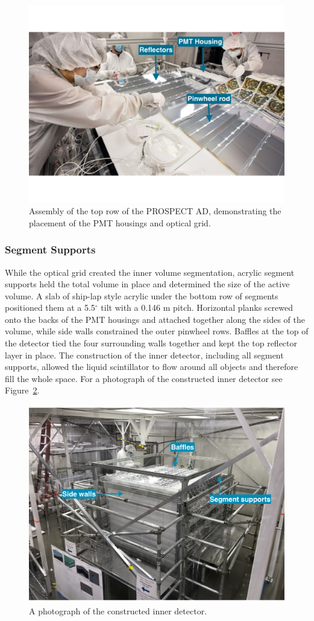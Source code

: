 \begin{figure}[]
	\centering
	\includegraphics[width=0.7\linewidth]{tex/4-prospect-images/RowAssembly}
	\caption{Assembly of the top row of the PROSPECT AD, demonstrating the placement of the PMT housings and optical grid.}
	\label{fig:rowassembly}
\end{figure}


\subsubsection{Segment Supports}

While the optical grid created the inner volume segmentation, acrylic segment supports held the total volume in place and determined the size of the active volume.
A slab of ship-lap style acrylic under the bottom row of segments positioned them at a 5.5$^{\circ}$ tilt with a 0.146 m pitch.
Horizontal planks screwed onto the backs of the PMT housings and attached together along the sides of the volume, while side walls constrained the outer pinwheel rows. 
Baffles at the top of the detector tied the four surrounding walls together and kept the top reflector layer in place. 
The construction of the inner detector, including all segment supports, allowed the liquid scintillator to flow around all objects and therefore fill the whole space.
For a photograph of the constructed inner detector see Figure~\ref{fig:completeddetector}.
\begin{figure}[h]
	\centering
	\includegraphics[width=0.7\linewidth]{tex/4-prospect-images/CompletedDetector}
	\caption{A photograph of the constructed inner detector.}
	\label{fig:completeddetector}
\end{figure}


